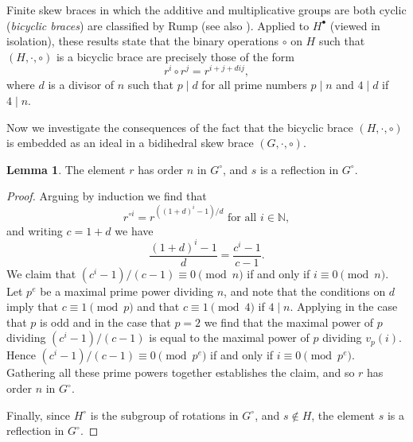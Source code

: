 \documentclass[reqno]{amsart}
\theoremstyle{definition}
\newtheorem{lemma}[theorem]{Lemma}
\newcommand{\N}{\mathbb{N}}
\begin{document}
Finite skew braces in which the additive and multiplicative groups are both cyclic (\textit{bicyclic braces}) are classified by Rump \cite{Ru07b} (see also \cite{STr}). Applied  to $ H^{\bullet} $ (viewed in isolation), these results state that the binary operations $ \circ $ on $ H $ such that $ (H,\cdot,\circ) $ is a bicyclic brace are precisely those of the form 
\begin{equation} \label{eqn_rump_bicyclic}
r^{i} \circ r^{j} = r^{i+j+dij}, 
\end{equation}
where $ d $ is a divisor of $ n $ such that $ p \mid d $ for all prime numbers $ p \mid n $ and $ 4 \mid d $ if $ 4 \mid n $. 

Now we investigate the consequences of the fact that the bicyclic brace $ (H,\cdot,\circ) $ is embedded as an ideal in a bidihedral skew brace $ (G,\cdot,\circ) $.

\begin{lemma}
The element $ r $ has order $ n $ in $ G^{\circ} $, and $ s $ is a reflection in $ G^{\circ} $.
\end{lemma}
\begin{proof}
Arguing by induction we find that
\[ r^{\circ i} = r^{((1+d)^{i} - 1)/d} \mbox{ for all } i \in \N,  \]
and writing $ c=1+d $ we have
\[ \frac{ (1+d)^{i} - 1 }{d} = \frac{ c^{i} - 1 }{c - 1}. \]
We claim that $ (c^{i} - 1 )/(c - 1) \equiv 0 \pmod{n} $ if and only if $ i \equiv 0 \pmod{n} $. Let $ p^{e} $ be a maximal prime power dividing $ n $, and note that the conditions on $ d $ imply that $ c \equiv 1 \pmod{p} $ and that $ c \equiv 1 \pmod{4} $ if $ 4 \mid n $. Applying \cite[Lemma 3.1, part (ii)]{STr} in the case that $ p $ is odd and \cite[Proposition 7.1]{By07} in the case that $ p=2 $ we find that the maximal power of $ p $ dividing $ (c^{i} - 1)/(c-1) $ is equal to the maximal power of $ p $ dividing  $ v_{p}(i) $. Hence $(c^{i} - 1)/(c - 1) \equiv 0 \pmod{p^{e}} $ if and only if $ i \equiv 0 \pmod{p^{e}} $. Gathering all these prime powers together establishes the claim, and so $ r $ has order $ n $ in $ G^{\circ} $. 

Finally, since $ H^{\circ} $ is the subgroup of rotations in $ G^{\circ} $, and $ s \not \in H $, the element $ s $ is a reflection in $ G^{\circ} $. 
\end{proof}
\end{document}
